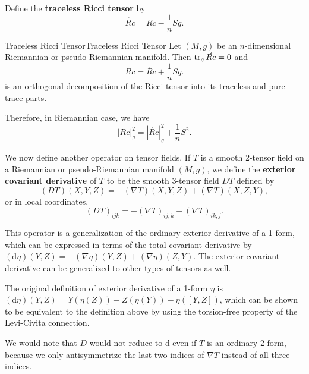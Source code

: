 \documentclass[../main.tex]{subfiles}
\begin{document}
Define the \textbf{traceless Ricci tensor} by
\begin{equation}
	\mathring{Rc} = Rc - \frac{1}{n} S g.
\end{equation}

\begin{proposition}{Traceless Ricci Tensor}{Traceless Ricci Tensor}
	Let $(M, g)$ be an $n$-dimensional Riemannian or pseudo-Riemannian manifold. Then $\operatorname{tr}_g \mathring{Rc} = 0$ and
	\begin{equation}
		Rc = \mathring{Rc} + \frac{1}{n} S g.
	\end{equation}
	is an orthogonal decomposition of the Ricci tensor into its traceless and pure-trace parts.

	Therefore, in Riemannian case, we have
	\begin{equation}
		|Rc|_g^2 = |\mathring{Rc}|_g^2 + \frac{1}{n} S^2.
	\end{equation}
\end{proposition}

We now define another operator on tensor fields. If $T$ is a smooth 2-tensor field on a Riemannian or pseudo-Riemannian manifold $(M, g)$, we define the \textbf{exterior covariant derivative} of $T$ to be the smooth 3-tensor field $DT$ defined by
\begin{equation}
	(DT)(X, Y, Z) = -(\nabla T)(X, Y, Z) + (\nabla T)(X, Z, Y),
\end{equation}
or in local coordinates,
\begin{equation}
	(DT)_{ijk} = -(\nabla T)_{ij;k} + (\nabla T)_{ik;j}.
\end{equation}

\begin{remark}
	This operator is a generalization of the ordinary exterior derivative of a 1-form, which can be expressed in terms of the total covariant derivative by $(\mathrm{d} \eta)(Y, Z) = -(\nabla \eta)(Y, Z) + (\nabla \eta)(Z, Y)$. The exterior covariant derivative can be generalized to other types of tensors as well.

	The original definition of exterior derivative of a 1-form $\eta$ is $(\mathrm{d} \eta)(Y, Z) = Y(\eta(Z)) - Z(\eta(Y)) - \eta([Y, Z])$, which can be shown to be equivalent to the definition above by using the torsion-free property of the Levi-Civita connection.

	We would note that $D$ would not reduce to $\mathrm{d}$ even if $T$ is an ordinary 2-form, because we only antisymmetrize the last two indices of $\nabla T$ instead of all three indices.
\end{remark}
\end{document}
